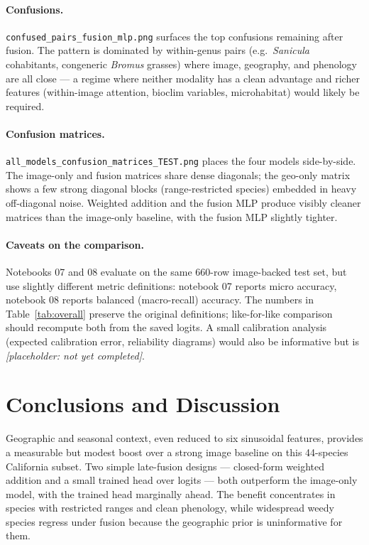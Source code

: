 \documentclass[11pt]{article}
\begin{document}
\paragraph{Confusions.} \texttt{confused\_pairs\_fusion\_mlp.png} surfaces the top confusions remaining after fusion. The pattern is dominated by within-genus pairs (e.g.\ \textit{Sanicula} cohabitants, congeneric \textit{Bromus} grasses) where image, geography, and phenology are all close --- a regime where neither modality has a clean advantage and richer features (within-image attention, bioclim variables, microhabitat) would likely be required.

\paragraph{Confusion matrices.} \texttt{all\_models\_confusion\_matrices\_TEST.png} places the four models side-by-side. The image-only and fusion matrices share dense diagonals; the geo-only matrix shows a few strong diagonal blocks (range-restricted species) embedded in heavy off-diagonal noise. Weighted addition and the fusion MLP produce visibly cleaner matrices than the image-only baseline, with the fusion MLP slightly tighter.

\paragraph{Caveats on the comparison.} Notebooks 07 and 08 evaluate on the same 660-row image-backed test set, but use slightly different metric definitions: notebook 07 reports micro accuracy, notebook 08 reports balanced (macro-recall) accuracy. The numbers in Table~\ref{tab:overall} preserve the original definitions; like-for-like comparison should recompute both from the saved logits. A small calibration analysis (expected calibration error, reliability diagrams) would also be informative but is \textit{[placeholder: not yet completed]}.

\section{Conclusions and Discussion}

Geographic and seasonal context, even reduced to six sinusoidal features, provides a measurable but modest boost over a strong image baseline on this 44-species California subset. Two simple late-fusion designs --- closed-form weighted addition and a small trained head over logits --- both outperform the image-only model, with the trained head marginally ahead. The benefit concentrates in species with restricted ranges and clean phenology, while widespread weedy species regress under fusion because the geographic prior is uninformative for them.
\end{document}
